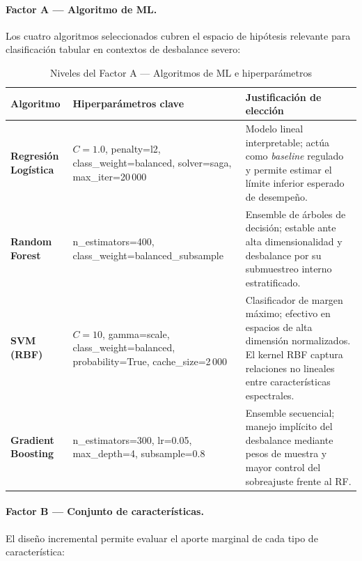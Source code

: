 \documentclass[12pt,a4paper]{article}
\begin{document}
\paragraph{Factor A — Algoritmo de ML.}
Los cuatro algoritmos seleccionados cubren el espacio de hipótesis relevante para
clasificación tabular en contextos de desbalance severo:

\begin{table}[H]
\centering
\caption{Niveles del Factor A — Algoritmos de ML e hiperparámetros}
\label{tab:factor_a}
\renewcommand{\arraystretch}{1.3}
\begin{tabularx}{\textwidth}{>{\bfseries}p{3cm}
                              >{\RaggedRight\arraybackslash}p{5.2cm}
                              >{\RaggedRight\arraybackslash}X}
\toprule
\textbf{Algoritmo} & \textbf{Hiperparámetros clave} & \textbf{Justificación de elección} \\
\midrule
Regresión Logística &
  $C=1.0$, penalty=l2, class\_weight=balanced, solver=saga, max\_iter=20\,000 &
  Modelo lineal interpretable; actúa como \textit{baseline} regulado y permite
  estimar el límite inferior esperado de desempeño. \\
\midrule
Random Forest &
  n\_estimators=400, class\_weight=balanced\_subsample &
  Ensemble de árboles de decisión; estable ante alta dimensionalidad y desbalance
  por su submuestreo interno estratificado. \\
\midrule
SVM (RBF) &
  $C=10$, gamma=scale, class\_weight=balanced, probability=True, cache\_size=2\,000 &
  Clasificador de margen máximo; efectivo en espacios de alta dimensión normalizados.
  El kernel RBF captura relaciones no lineales entre características espectrales. \\
\midrule
Gradient Boosting &
  n\_estimators=300, lr=0.05, max\_depth=4, subsample=0.8 &
  Ensemble secuencial; manejo implícito del desbalance mediante pesos de muestra
  y mayor control del sobreajuste frente al RF. \\
\bottomrule
\end{tabularx}
\end{table}

\paragraph{Factor B — Conjunto de características.}
El diseño incremental permite evaluar el aporte marginal de cada tipo de característica:
\end{document}
